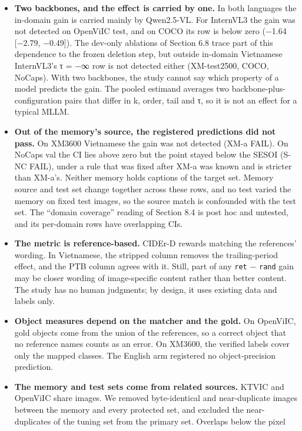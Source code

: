 \documentclass[manuscript,screen]{acmart}
\providecommand{\tightlist}{\setlength{\itemsep}{0pt}\setlength{\parskip}{0pt}}
\begin{document}
\begin{itemize}
\tightlist
\item
  \textbf{Two backbones, and the effect is carried by one.} In both languages the in-domain gain is
  carried mainly by Qwen2.5-VL. For InternVL3 the gain was not detected on OpenViIC test, and on
  COCO its row is below zero (−1.64 {[}−2.79, −0.49{]}). The dev-only ablations of Section 6.8 trace
  part of this dependence to the frozen deletion step, but outside in-domain Vietnamese InternVL3's
  τ = −∞ row is not detected either (XM-test2500, COCO, NoCaps). With two backbones, the study
  cannot say which property of a model predicts the gain. The pooled estimand averages two
  backbone-plus-configuration pairs that differ in k, order, tail and τ, so it is not an effect for
  a typical MLLM.
\item
  \textbf{Out of the memory's source, the registered predictions did not pass.} On XM3600 Vietnamese
  the gain was not detected (XM-a FAIL). On NoCaps val the CI lies above zero but the point stayed
  below the SESOI (S-NC FAIL), under a rule that was fixed after XM-a was known and is stricter than
  XM-a's. Neither memory holds captions of the target set. Memory source and test set change
  together across these rows, and no test varied the memory on fixed test images, so the source
  match is confounded with the test set. The ``domain coverage'' reading of Section 8.4 is post hoc
  and untested, and its per-domain rows have overlapping CIs.
\item
  \textbf{The metric is reference-based.} CIDEr-D rewards matching the references' wording. In
  Vietnamese, the stripped column removes the trailing-period effect, and the PTB column agrees with
  it. Still, part of any \texttt{ret} − \texttt{rand} gain may be closer wording of image-specific
  content rather than better content. The study has no human judgments; by design, it uses existing
  data and labels only.
\item
  \textbf{Object measures depend on the matcher and the gold.} On OpenViIC, gold objects come from
  the union of the references, so a correct object that no reference names counts as an error. On
  XM3600, the verified labels cover only the mapped classes. The English arm registered no
  object-precision prediction.
\item
  \textbf{The memory and test sets come from related sources.} KTVIC and OpenViIC share images. We
  removed byte-identical and near-duplicate images between the memory and every protected set, and
  excluded the near-duplicates of the tuning set from the primary set. Overlaps below the pixel

\end{itemize}
\end{document}
